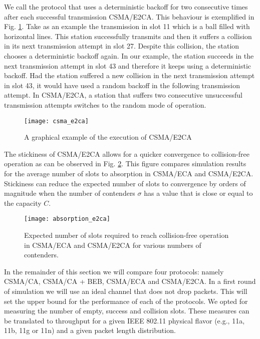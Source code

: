 \documentclass[journal]{IEEEtran}
\begin{document}
We call the protocol that uses a deterministic backoff for two consecutive times after each successful transmission CSMA/E2CA. This behaviour is exemplified in Fig. \ref{fig:csma_e2ca}. Take as an example the transmission in slot 11 which is a ball filled with horizontal lines. This station successfully transmits and then it suffers a collision in its next transmission attempt in slot 27. Despite this collision, the station chooses a deterministic backoff again. 
 In our example, the station succeeds in the next transmission attempt in slot 43 and therefore it keeps using a deterministic backoff.
Had the station suffered a new collision in the next transmission attempt in slot 43, it would have used a random backoff in the following transmission attempt. In CSMA/E2CA, a station that suffers two consecutive unsuccessful transmission attempts switches to the random mode of operation.

\begin{figure}[!t]
\centering
\texttt{[image: csma\_e2ca]}
\caption{A graphical example of the execution of CSMA/E2CA}
\label{fig:csma_e2ca}
\end{figure}

The stickiness of CSMA/E2CA allows for a quicker convergence to collision-free operation as can be observed in Fig. \ref{fig:absorption_e2ca}. This figure compares simulation results for the average number of slots to absorption in CSMA/ECA and CSMA/E2CA. Stickiness can reduce the expected number of slots to convergence by orders of magnitude when the number of contenders $\sigma$ has a value that is close or equal to the capacity $C$.

\begin{figure}[!t]
\centering
\texttt{[image: absorption\_e2ca]}
\caption{Expected number of slots required to reach collision-free operation in CSMA/ECA and CSMA/E2CA for various numbers of contenders.}
\label{fig:absorption_e2ca}
\end{figure}

In the remainder of this section we will compare four protocols: namely CSMA/CA, CSMA/CA + BEB, CSMA/ECA and CSMA/E2CA. In a first round of simulation we will use an ideal channel that does not drop packets. This will set the upper bound for the performance of each of the protocols. We opted for measuring the number of empty, success and collision slots. These measures can be translated to throughput for a given IEEE 802.11 physical flavor (e.g., 11a, 11b, 11g or 11n) and a given packet length distribution.
\end{document}
